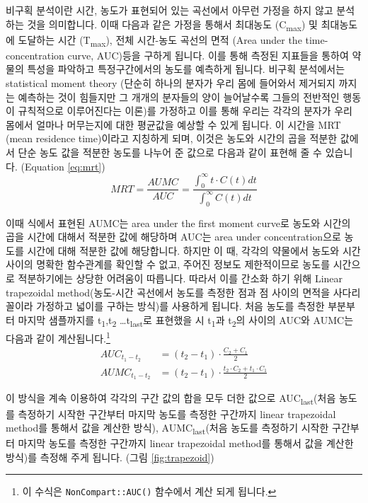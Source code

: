 \documentclass[
  12pt,
]{krantz}
\begin{document}
비구획 분석이란 시간, 농도가 표현되어 있는 곡선에서 아무런 가정을 하지 않고 분석하는 것을 의미합니다.
이때 다음과 같은 가정을 통해서 최대농도 (C\textsubscript{max}) 및 최대농도에 도달하는 시간 (T\textsubscript{max}), 전체 시간-농도 곡선의 면적 (Area under the time-concentration curve, AUC)등을 구하게 됩니다.
이를 통해 측정된 지표들을 통하여 약물의 특성을 파악하고 특정구간에서의 농도를 예측하게 됩니다.
비구획 분석에서는 statistical moment theory (단순히 하나의 분자가 우리 몸에 들어와서 제거되지 까지는 예측하는 것이 힘들지만 그 개개의 분자들의 양이 늘어날수록 그들의 전반적인 행동이 규칙적으로 이루어진다는 이론)를 가정하고 이를 통해 우리는 각각의 분자가 우리 몸에서 얼마나 머무는지에 대한 평균값을 예상할 수 있게 됩니다.
이 시간을 MRT (mean residence time)이라고 지칭하게 되며, 이것은 농도와 시간의 곱을 적분한 값에서 단순 농도 값을 적분한 농도를 나누어 준 값으로 다음과 같이 표현해 줄 수 있습니다. (Equation \eqref{eq:mrt})
\begin{equation}
  MRT = \frac{AUMC}{AUC} = \frac{\int_{0}^{\infty} t \cdot C(t) dt}{\int_{0}^{\infty} C(t) dt}
\label{eq:mrt}
\end{equation}

이때 식에서 표현된 AUMC는 area under the first moment curve로 농도와 시간의 곱을 시간에 대해서 적분한 값에 해당하며 AUC는 area under concentration으로 농도를 시간에 대해 적분한 값에 해당합니다.
하지만 이 때, 각각의 약물에서 농도와 시간 사이의 명확한 함수관계를 확인할 수 없고, 주어진 정보도 제한적이므로 농도를 시간으로 적분하기에는 상당한 어려움이 따릅니다.
따라서 이를 간소화 하기 위해 Linear trapezoidal method(농도-시간 곡선에서 농도를 측정한 점과 점 사이의 면적을 사다리꼴이라 가정하고 넓이를 구하는 방식)를 사용하게 됩니다.
처음 농도를 측정한 부분부터 마지막 샘플까지를 t\textsubscript{1},t\textsubscript{2} \ldots t\textsubscript{last}로 표현했을 시 t\textsubscript{1}과 t\textsubscript{2}의 사이의 AUC와 AUMC는 다음과 같이 계산됩니다.\footnote{이 수식은 \texttt{NonCompart::AUC()} 함수에서 계산 되게 됩니다.}
\begin{equation}
\begin{split}
  AUC_{t_1-t_2} & = 
    (t_2-t_1)\cdot \frac{C_2+C_1}{2} \\
  AUMC_{t_1-t_2} & = 
    (t_2-t_1)\cdot \frac{t_2 \cdot C_2 + t_1 \cdot C_1}{2}
\end{split}
\label{eq:auc-aumc}
\end{equation}

이 방식을 계속 이용하여 각각의 구간 값의 합을 모두 더한 값으로 AUC\textsubscript{last}(처음 농도를 측정하기 시작한 구간부터 마지막 농도를 측정한 구간까지 linear trapezoidal method를 통해서 값을 계산한 방식), AUMC\textsubscript{last}(처음 농도를 측정하기 시작한 구간부터 마지막 농도를 측정한 구간까지 linear trapezoidal method를 통해서 값을 계산한 방식)를 측정해 주게 됩니다. (그림 \ref{fig:trapezoid})
\end{document}
